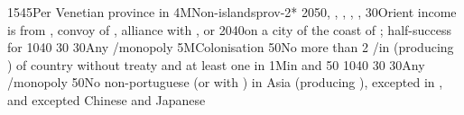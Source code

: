 %
%
{15}{45}{Per Venetian province in \regionBalkans}%
%
\EUobjective4M{Non-\TUR islands}{prov-2*}%
{20}{50}{\provinceChypre, \provinceKreta, \provinceCyclades, \provinceCorfu,
  \provinceMalta, \provinceRhodos}%
%
%
%
{}{30}{Orient income is from , convoy of \villeIzmir,
  alliance with \paysaden, \paysoman or \paysgujarat}%
%
 
%
%
{20}{40}{\COL on a city of the coast of \continentIndia; half-success for
  \granderegionCeylan}%
%
%
{10}{40}{}%
%
%
{}{30}{}%
%
%
{}{30}{Any \CTZ/\STZ monopoly}%
%
\EUobjective5M{Colonisation}{}%
{}{50}{No more than 2 \COL/\TP in \continentAsia (producing \POSPICE) of
  country without treaty and at least one \COL in \continentBrazil}%
%
%
%
\EUobjective1M{\TP in \payschine and \paysjapon}{}%
{}{50}{}%
%
%
{10}{40}{}%
%
%
{}{30}{}%
%
%
{}{30}{Any \CTZ/\STZ monopoly}%
%
%
{}{50}{No non-portuguese \TP (or with \dipAT) in Asia (producing \POSPICE),
  excepted in , and excepted Chinese and Japanese
  \TP}%

\makeatother

